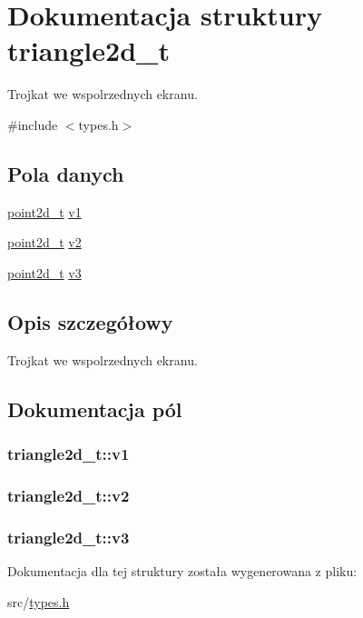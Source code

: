 \hypertarget{structtriangle2d__t}{\section{Dokumentacja struktury triangle2d\-\_\-t}
\label{structtriangle2d__t}
}


Trojkat we wspolrzednych ekranu.  




{\ttfamily \#include $<$types.\-h$>$}

\subsection*{Pola danych}
\begin{DoxyCompactItemize}
\item 
\hyperlink{structpoint2d__t}{point2d\-\_\-t} \hyperlink{structtriangle2d__t_a7540086d30cd533bb9f67ad406bab302}{v1}
\item 
\hyperlink{structpoint2d__t}{point2d\-\_\-t} \hyperlink{structtriangle2d__t_a21411505c9e1229b458a3de02418cc0c}{v2}
\item 
\hyperlink{structpoint2d__t}{point2d\-\_\-t} \hyperlink{structtriangle2d__t_abcc2002205b2a722687d7a2bf3a8745a}{v3}
\end{DoxyCompactItemize}


\subsection{Opis szczegółowy}
Trojkat we wspolrzednych ekranu. 

\subsection{Dokumentacja pól}
\hypertarget{structtriangle2d__t_a7540086d30cd533bb9f67ad406bab302}{
\subsubsection[{v1}]{ triangle2d\-\_\-t\-::v1}}\label{structtriangle2d__t_a7540086d30cd533bb9f67ad406bab302}
\hypertarget{structtriangle2d__t_a21411505c9e1229b458a3de02418cc0c}{
\subsubsection[{v2}]{ triangle2d\-\_\-t\-::v2}}\label{structtriangle2d__t_a21411505c9e1229b458a3de02418cc0c}
\hypertarget{structtriangle2d__t_abcc2002205b2a722687d7a2bf3a8745a}{
\subsubsection[{v3}]{ triangle2d\-\_\-t\-::v3}}\label{structtriangle2d__t_abcc2002205b2a722687d7a2bf3a8745a}


Dokumentacja dla tej struktury została wygenerowana z pliku\-:\begin{DoxyCompactItemize}
\item 
src/\hyperlink{types_8h}{types.\-h}\end{DoxyCompactItemize}

